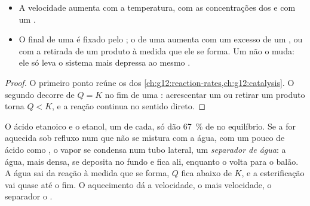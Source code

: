 \begin{proposition}\label{prop:g12:synthesis-strategy:levers}
\begin{itemize}
  \item A velocidade aumenta com a temperatura, com as concentrações dos
         e com um .
  \item O  final de uma  é fixado pelo ; o de uma  aumenta com um excesso de
        um , ou com a retirada de um produto à medida que ele se
        forma. Um  não o muda: ele só leva o sistema mais
        depressa ao mesmo .
\end{itemize}
\end{proposition}

\begin{proof}
O primeiro ponto reúne os  dos
\cref{ch:g12:reaction-rates,ch:g12:catalysis}. O segundo decorre de
$Q = K$ no fim de uma : acrescentar um  ou retirar
um produto torna $Q < K$, e a reação continua no sentido direto.
\end{proof}

\begin{example}\label{ex:g12:synthesis-strategy:trap}
O ácido etanoico e o etanol, um  de cada, só dão \qty{67}{\percent}
de  no equilíbrio. Se a  for aquecida sob refluxo num
 que não se mistura com a água, com um pouco de ácido como
, o vapor se condensa num tubo lateral, um \emph{separador de
água}: a água, mais densa, se deposita no fundo e fica ali, enquanto o
 volta para o balão. A água sai da reação à medida que se forma,
$Q$ fica abaixo de $K$, e a esterificação vai quase até o fim. O
aquecimento dá a velocidade, o  mais velocidade, o separador
o .
\end{example}

